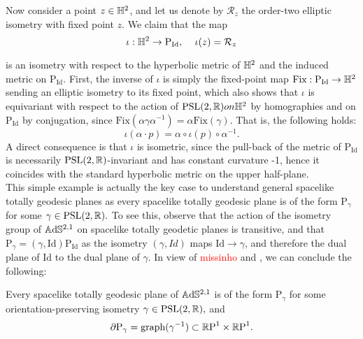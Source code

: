 Now consider a point $z\in\mathbb{H}^2$, and let us denote by $\mathcal{R}_z$ the order-two elliptic isometry with fixed point $z$. We claim that the map 
\[
    \iota:\H^2\to\text{P}_{\text{Id}},\;\;\;\ \iota(z)=\mathcal{R}_z
\]

is an isometry with respect to the hyperbolic metric of $\mathbb{H}^2$ and the induced metric on $\text{P}_{\text{Id}}.$ First, the inverse of $\iota$ is simply the fixed-point map $\text{Fix}:\text{P}_{\text{Id}}\to\mathbb{H}^2$ sending an elliptic isometry to its fixed point, which also shows that $\iota$ is equivariant with respect to the action of $\text{PSL}(2,\mathbb{R}) on \mathbb{H}^2$ by homographies and on $\text{P}_\text{Id}$ by conjugation, since $\text{Fix}(\alpha\gamma\alpha^{-1})=\alpha\text{Fix}(\gamma).$ That is, the following holds: 
\begin{equation}
    \iota(\alpha\cdot p)=\alpha\circ\iota(p)\circ\alpha^{-1}.
\end{equation} 
A direct consequence is that $\iota$ is isometric, since the pull-back of the metric of $\text{P}_\text{Id}$ is necessarily $\text{PSL}(2,\mathbb{R})$-invariant and has constant curvature -1, hence it coincides with the standard hyperbolic metric on the upper half-plane.\\
This simple example is actually the key case to understand general spacelike totally geodesic planes as every spacelike totally geodesic plane is of the form $\text{P}_\gamma$ for some $\gamma\in\text{PSL}(2,\mathbb{R}).$ To see this, observe that the action of the isometry group of $\mathbb{A}\mathrm{d}\mathbb{S}^{2,1}$ on spacelike totally geodetic planes is transitive, and that $\text{P}_\gamma=(\gamma,\text{Id})\text{P}_{\text{Id}}$ as the isometry $(\gamma,Id)$ maps $\text{Id}\to\gamma$, and therefore the dual plane of $\text{Id}$ to the dual plane of $\gamma.$ In view of \textcolor{red}{missinho} and , we can conclude the following: 
\begin{lemma}
    Every spacelike totally geodesic plane of $\mathbb{A}\mathrm{d}\mathbb{S}^{2,1}$ is of the form $\text{P}_\gamma$ for some orientation-preserving isometry $\gamma\in\text{PSL}(2,\mathbb{R}),$ and 
    \[
        \partial\text{P}_\gamma=\text{graph}(\gamma^{-1})\subset\mathbb{R}\text{P}^1\times\mathbb{R}\text{P}^1.
    \]
\end{lemma}
